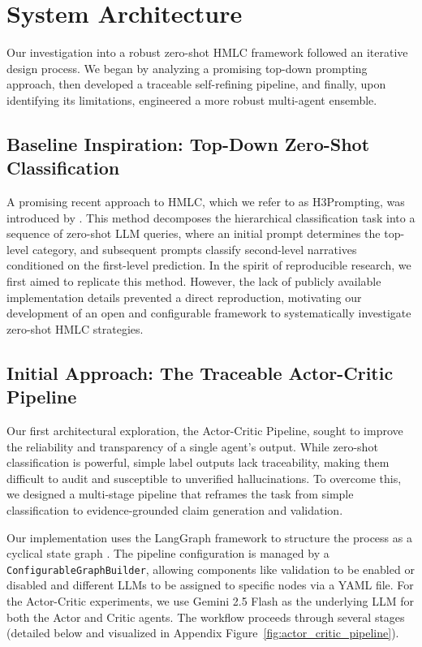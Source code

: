 \section{System Architecture}

Our investigation into a robust zero-shot HMLC framework followed an iterative design process. We began by analyzing a promising top-down prompting approach, then developed a traceable self-refining pipeline, and finally, upon identifying its limitations, engineered a more robust multi-agent ensemble.

\subsection{Baseline Inspiration: Top-Down Zero-Shot Classification}

A promising recent approach to HMLC, which we refer to as H3Prompting, was introduced by \citet{singh-etal-2025-gatenlp}. This method decomposes the hierarchical classification task into a sequence of zero-shot LLM queries, where an initial prompt determines the top-level category, and subsequent prompts classify second-level narratives conditioned on the first-level prediction. In the spirit of reproducible research, we first aimed to replicate this method. However, the lack of publicly available implementation details prevented a direct reproduction, motivating our development of an open and configurable framework to systematically investigate zero-shot HMLC strategies.

\subsection{Initial Approach: The Traceable Actor-Critic Pipeline}

Our first architectural exploration, the Actor-Critic Pipeline, sought to improve the reliability and transparency of a single agent's output. While zero-shot classification is powerful, simple label outputs lack traceability, making them difficult to audit and susceptible to unverified hallucinations. To overcome this, we designed a multi-stage pipeline that reframes the task from simple classification to evidence-grounded claim generation and validation.

Our implementation uses the LangGraph framework to structure the process as a cyclical state graph \citep{langgraph2024}. The pipeline configuration is managed by a \texttt{ConfigurableGraphBuilder}, allowing components like validation to be enabled or disabled and different LLMs to be assigned to specific nodes via a YAML file. For the Actor-Critic experiments, we use Gemini 2.5 Flash as the underlying LLM for both the Actor and Critic agents. The workflow proceeds through several stages (detailed below and visualized in Appendix Figure~\ref{fig:actor_critic_pipeline}).

